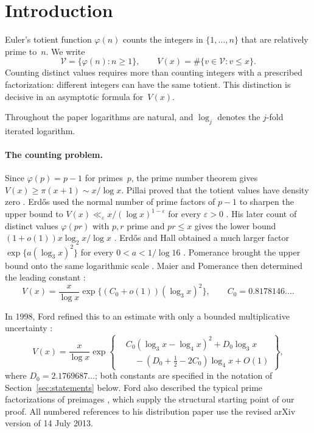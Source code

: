 \section{Introduction}\label{sec:introduction}
Euler's totient function $\varphi(n)$ counts the integers in $\{1,\ldots,n\}$ that are relatively prime to~$n$. We write
\[
 \mathcal V=\{\varphi(n):n\ge1\},\qquad
 V(x)=\#\{v\in\mathcal V:v\le x\}.
\]
Counting distinct values requires more than counting integers with a
prescribed factorization: different integers can have the same totient.
This distinction is decisive in an asymptotic formula for~$V(x)$.

Throughout the paper logarithms are natural, and $\log_j$ denotes
the $j$-fold iterated logarithm.

\paragraph{The counting problem.}
Since $\varphi(p)=p-1$ for primes~$p$, the prime number theorem gives
$V(x)\ge\pi(x+1)\sim x/\log x$.
Pillai proved that the totient values have density zero
\cite{Pillai1929}. Erd\H{o}s used the normal number of prime factors
of $p-1$ to sharpen the upper bound to
$V(x)\ll_\varepsilon x/(\log x)^{1-\varepsilon}$ for every
$\varepsilon>0$ \cite[Section~2]{Erdos1935}.
His later count of distinct values $\varphi(pr)$ with $p,r$ prime and
$pr\le x$ gives the lower bound
$(1+o(1))x\log_2x/\log x$ \cite[pp.~542--543]{Erdos1945}.
Erd\H{o}s and Hall obtained a much larger factor
$\exp\{a(\log_3x)^2\}$ for every $0<a<1/\log16$
\cite[pp.~1--3]{ErdosHall1976}. Pomerance brought the upper bound onto
the same logarithmic scale \cite[Equation~(1.4)]{Pomerance1986}.
Maier and Pomerance then determined the leading constant
\cite[Section~1]{MaierPomerance1988}:
\[
 V(x)=\frac{x}{\log x}
       \exp\{(C_0+o(1))(\log_3x)^2\},\qquad
 C_0=0.8178146\ldots.
\]

In 1998, Ford refined this to an estimate with only a bounded multiplicative
uncertainty \cite[Theorem~1]{FordTotients2013}:
\begin{equation}\label{eq:classical-order}
 V(x)=\frac{x}{\log x}\exp\left\{
 \begin{aligned}
 &C_0(\log_3x-\log_4x)^2+D_0\log_3x\\
 &\hspace{12pt}-(D_0+\tfrac12-2C_0)\log_4x+O(1)
 \end{aligned}\right\},
\end{equation}
where $D_0=2.1769687\ldots$; both constants are specified in the
notation of Section~\ref{sec:statements} below. Ford also described
the typical prime factorizations of preimages
\cite[Theorems~10 and~16]{FordTotients2013}, which supply the
structural starting point of our proof. All numbered references to
his distribution paper use the revised arXiv version of 14 July 2013.

